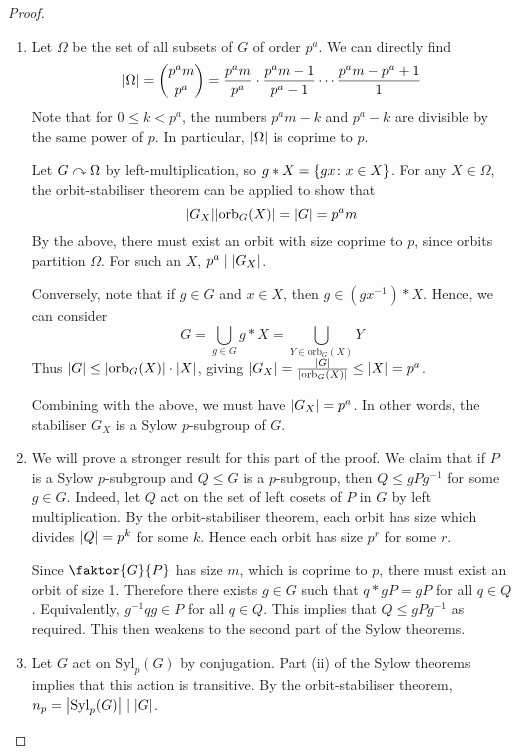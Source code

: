 \begin{proof}
	\begin{enumerate}
		\item Let \( \Omega \) be the set of all subsets of \( G \) of order \( p^a \).
		      We can directly find
		      \[
			      \abs{\Omega} = \binom{p^a m}{p^a} = \frac{p^a m}{p^a} \cdot \frac{p^a m - 1}{p^a - 1} \cdots \frac{p^a m - p^a + 1}{1}
		      \]
		      Note that for \( 0 \leq k < p^a \), the numbers \( p^a m - k \) and \( p^a - k \) are divisible by the same power of \( p \).
		      In particular, \( \abs{\Omega} \) is coprime to \( p \).

		      Let \( G \curvearrowright \Omega \) by left-multiplication, so \( g \ast X = \qty{gx \colon x \in X} \).
		      For any \( X \in \Omega \), the orbit-stabiliser theorem can be applied to show that
		      \[
			      \abs{G_X} \abs{\mathrm{orb}_G(X)} = \abs{G} = p^a m
		      \]
		      By the above, there must exist an orbit with size coprime to \( p \), since orbits partition \( \Omega \).
		      For such an \( X \), \( p^a \mid \abs{G_X} \).

		      Conversely, note that if \( g \in G \) and \( x \in X \), then \( g \in (gx^{-1}) \ast X \).
		      Hence, we can consider
		      \[
			      G = \bigcup_{g \in G} g \ast X = \bigcup_{Y \in \mathrm{orb}_G(X)} Y
		      \]
		      Thus \( \abs{G} \leq \abs{\mathrm{orb}_G(X)} \cdot \abs{X} \), giving \( \abs{G_X} = \frac{\abs{G}}{\abs{\mathrm{orb}_G(X)}} \leq \abs{X} = p^a \).

		      Combining with the above, we must have \( \abs{G_X} = p^a \).
		      In other words, the stabiliser \( G_X \) is a Sylow \( p \)-subgroup of \( G \).
		\item We will prove a stronger result for this part of the proof.
		      We claim that if \( P \) is a Sylow \( p \)-subgroup and \( Q \leq G \) is a \( p \)-subgroup, then \( Q \leq g P g^{-1} \) for some \( g \in G \).
		      Indeed, let \( Q \) act on the set of left cosets of \( P \) in \( G \) by left multiplication.
		      By the orbit-stabiliser theorem, each orbit has size which divides \( \abs{Q} = p^k \) for some \( k \).
		      Hence each orbit has size \( p^r \) for some \( r \).

		      Since \( \faktor{G}{P} \) has size \( m \), which is coprime to \( p \), there must exist an orbit of size 1.
		      Therefore there exists \( g \in G \) such that \( q \ast gP = gP \) for all \( q \in Q \).
		      Equivalently, \( g^{-1} q g \in P \) for all \( q \in Q \).
		      This implies that \( Q \leq gPg^{-1} \) as required.
		      This then weakens to the second part of the Sylow theorems.
		\item Let \( G \) act on \( \mathrm{Syl}_p(G) \) by conjugation.
		      Part (ii) of the Sylow theorems implies that this action is transitive.
		      By the orbit-stabiliser theorem, \( n_p = \abs{\mathrm{Syl}_p(G)} \mid \abs{G} \).


\end{enumerate}
\end{proof}
